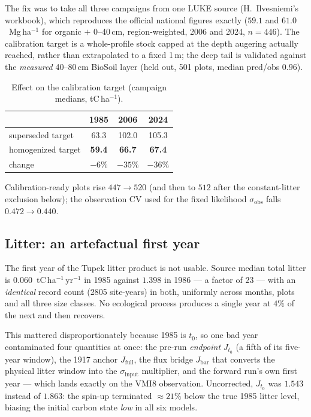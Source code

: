 \documentclass[11pt]{article}
\newcommand{\sinput}{\sigma_{\mathrm{input}}}
\newcommand{\sobs}{\sigma_{\mathrm{obs}}}
\begin{document}
The fix was to take all three campaigns from one LUKE source (H.~Ilvesniemi's workbook),
which reproduces the official national figures exactly ($59.1$ and $61.0$~Mg\,ha$^{-1}$ for
organic $+$ 0--40\,cm, region-weighted, 2006 and 2024, $n=446$). The calibration target is a
whole-profile stock capped at the depth augering actually reached, rather than extrapolated to
a fixed 1\,m; the deep tail is validated against the \emph{measured} 40--80\,cm BioSoil layer
(held out, 501 plots, median pred/obs $0.96$).

\begin{table}[H]\centering\small
\caption{Effect on the calibration target (campaign medians, tC\,ha$^{-1}$).}
\begin{tabular}{lccc}\toprule
 & 1985 & 2006 & 2024\\\midrule
superseded target & 63.3 & 102.0 & 105.3\\
homogenized target & \textbf{59.4} & \textbf{66.7} & \textbf{67.4}\\
change & $-6\%$ & $-35\%$ & $-36\%$\\\bottomrule
\end{tabular}
\end{table}

\noindent Calibration-ready plots rise $447 \rightarrow 520$ (and then to $512$ after the
constant-litter exclusion below); the observation CV used for the fixed likelihood $\sobs$
falls $0.472 \rightarrow 0.440$.

\subsection{Litter: an artefactual first year}
The first year of the Tupek litter product is not usable. Source median total litter is
$0.060$~tC\,ha$^{-1}$\,yr$^{-1}$ in 1985 against $1.398$ in 1986 --- a factor of 23 --- with an
\emph{identical} record count (2805 site-years) in both, uniformly across months, plots and all
three size classes. No ecological process produces a single year at $4\%$ of the next and then
recovers.

This mattered disproportionately because 1985 is $t_0$, so one bad year contaminated four
quantities at once: the pre-run \emph{endpoint} $J_{t_0}$ (a fifth of its five-year window),
the 1917 anchor $J_{\mathrm{full}}$, the flux bridge $J_{\mathrm{bar}}$ that converts the
physical litter window into the $\sinput$ multiplier, and the forward run's own first year ---
which lands exactly on the VMI8 observation. Uncorrected, $J_{t_0}$ was $1.543$ instead of
$1.863$: the spin-up terminated $\approx 21\%$ below the true 1985 litter level, biasing the
initial carbon state \emph{low} in all six models.
\end{document}
